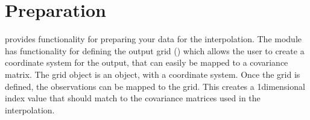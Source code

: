 \documentclass[letterpaper,10pt,english]{sphinxmanual}
\begin{document}
\section{Preparation}
\label{\detokenize{kriging:preparation}}
\sphinxAtStartPar
{} provides functionality for preparing your data for the interpolation. The 
module has functionality for defining the output grid
({\hyperref[\detokenize{covariance:glomar_gridding.grid.grid_from_resolution}]{}}) which allows the user to create a coordinate
system for the output, that can easily be mapped to a covariance matrix. The grid object is an
 object, with a coordinate system. Once the grid is defined, the observations can
be mapped to the grid. This creates a 1\sphinxhyphen{}dimensional index value that should match to the covariance
matrices used in the interpolation.
\end{document}
